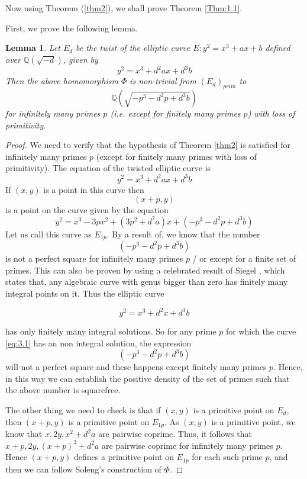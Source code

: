 \documentclass[12pt, 14paper]{amsart}
\theoremstyle{plain}
\newtheorem{lemma}[subsection]{Lemma}
\numberwithin{equation}{section}
\newcommand \QQ {{\mathbb Q}}
\begin{document}
Now using Theorem (\ref{thm2}), we shall prove Theorem \eqref{Thm:1.1}.

First, we prove the following lemma.

\begin{lemma}
\label{lemma1}
Let $E_d$ be the twist of the elliptic curve $E:y^2=x^3+ax+b$ defined over $\QQ(\sqrt{-d})$,  given by 
$$y^2=x^3+d^2ax+d^3b$$
Then the above homomorphism $\Phi$ is non-trivial from $(E_d)_{prim}$ to 
$$\QQ(\sqrt{-p^3-d^2p+d^3b})$$ for infinitely many primes $p$ (i.e. except for finitely many primes $p$) with loss of primitivity.
\end{lemma}
\begin{proof}
We need to verify that the hypothesis of Theorem \ref{thm2} is satisfied for infinitely many primes $p$ (except for finitely many primes with loss of primitivity). The equation of the twisted elliptic curve is 
$$y^2=x^3+d^2ax+d^3b$$
If $(x,y)$ is a point in this curve then 
$$(x+p,y)$$ is a point on the curve given by the equation
$$y^2=x^3-3px^2+(3p^2+d^2a)x+(-p^3-d^2p+d^3b)$$
Let us call this curve as $E_{1p}$. By a result of\cite{H76}, we know that the number 
$$(-p^3-d^2p+d^3b)$$
is not a perfect square for infinitely many primes $p$ / or except for a finite set of primes. This can also be proven by using a celebrated result of Siegel \cite{Si29}, which states that, any algebraic curve with genus bigger than zero has finitely many integral points on it. Thus  the elliptic curve

\begin{equation}
\label{eq:3.1}
    y^2=x^3+d^2x+d^3b 
\end{equation}

has only finitely many integral solutions. So for any prime $p$ for which the curve \eqref{eq:3.1} has an non integral solution, the expression 
$$(-p^3-d^2p+d^3b)$$
will not a perfect square and these happens except finitely many primes $p$. Hence, in this way we can establish the positive density of the set of primes such that the above number is squarefree.

The other thing we need to check is that if $(x,y)$ is a primitive point on $E_d$, then $(x+p,y)$ is a primitive point on $E_{1p}$. As $(x,y)$ is a primitive point,  we know that $x,2y, x^2+d^2a$ are pairwise coprime. Thus, it follows that $x+p,2y,(x+p)^2+d^2a$ are pairwise coprime for infinitely many primes $p$. Hence $(x+p,y)$ defines a primitive point on $E_{1p}$ for each such prime $p$, and then we can follow Soleng's construction of $\Phi$.
\end{proof}
\end{document}
